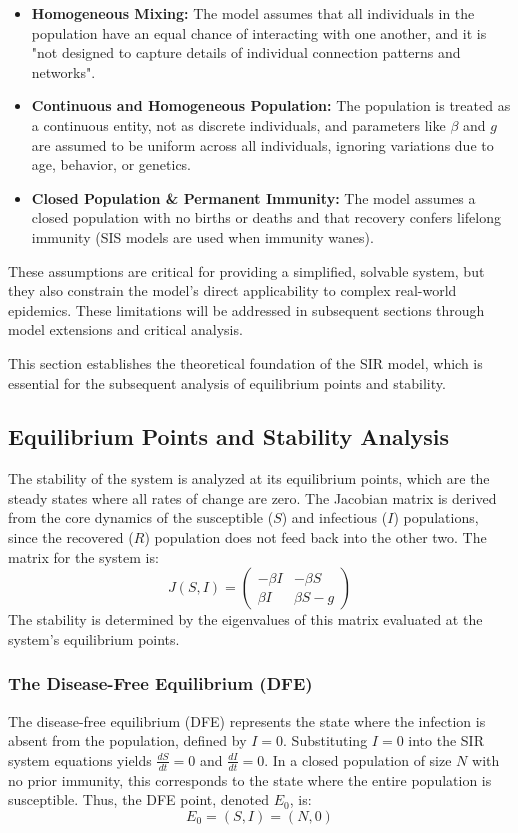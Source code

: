 \documentclass[12pt, a4paper]{article}
\begin{document}
\begin{itemize}
    \item \textbf{Homogeneous Mixing:} The model assumes that all individuals in the population have an equal chance of interacting with one another, and it is "not designed to capture details of individual connection patterns and networks".
    \item \textbf{Continuous and Homogeneous Population:} The population is treated as a continuous entity, not as discrete individuals, and parameters like $\beta$ and $g$ are assumed to be uniform across all individuals, ignoring variations due to age, behavior, or genetics.
    \item \textbf{Closed Population \& Permanent Immunity:} The model assumes a closed population with no births or deaths and that recovery confers lifelong immunity (SIS models are used when immunity wanes).
\end{itemize}

These assumptions are critical for providing a simplified, solvable system, but they also constrain the model's direct applicability to complex real-world epidemics. These limitations will be addressed in subsequent sections through model extensions and critical analysis.

This section establishes the theoretical foundation of the SIR model, which is essential for the subsequent analysis of equilibrium points and stability.

\subsection{Equilibrium Points and Stability Analysis}
The stability of the system is analyzed at its equilibrium points, which are the steady states where all rates of change are zero. The Jacobian matrix is derived from the core dynamics of the susceptible ($S$) and infectious ($I$) populations, since the recovered ($R$) population does not feed back into the other two. The matrix for the system is:
\[
J(S,I) =
\begin{pmatrix}
    -\beta I & -\beta S \\
    \beta I  & \beta S - g
\end{pmatrix}
\]
The stability is determined by the eigenvalues of this matrix evaluated at the system's equilibrium points.

\subsubsection{The Disease-Free Equilibrium (DFE)}
The disease-free equilibrium (DFE) represents the state where the infection is absent from the population, defined by $I=0$. Substituting $I=0$ into the SIR system equations yields $\frac{dS}{dt} = 0$ and $\frac{dI}{dt} = 0$. In a closed population of size $N$ with no prior immunity, this corresponds to the state where the entire population is susceptible. Thus, the DFE point, denoted $E_0$, is:
\[ E_0 = (S,I) = (N,0) \]
\end{document}
